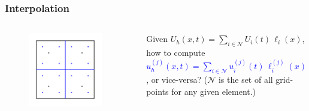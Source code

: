 \documentclass{beamer}
\begin{document}
\begin{frame}
\frametitle{Interpolation}

  \begin{columns}[c]


      \begin{figure}[htb!]
        \centering
        \includegraphics[width=0.9\textwidth]{fig.amrElement.png}
      \end{figure}


    Given $U_{h}\left(x,t\right)
    = \sum\limits_{i\in\mathcal{N}} U_{i}\left(t\right) \,
    \ell_{i}\left(x\right)$,
    how to compute \textcolor{blue}{$u_{h}^{\left(j\right)}\left(x,t\right)
    = \sum\limits_{i\in\mathcal{N}}
    u_{i}^{\left(j\right)}\left(t\right) \,
    \ell_{i}^{\left(j\right)}\left(x\right)$},
    or vice-versa?
    ($\mathcal{N}$ is the set of all grid-points for any given element.)

  \end{columns}

\end{frame}
\end{document}
